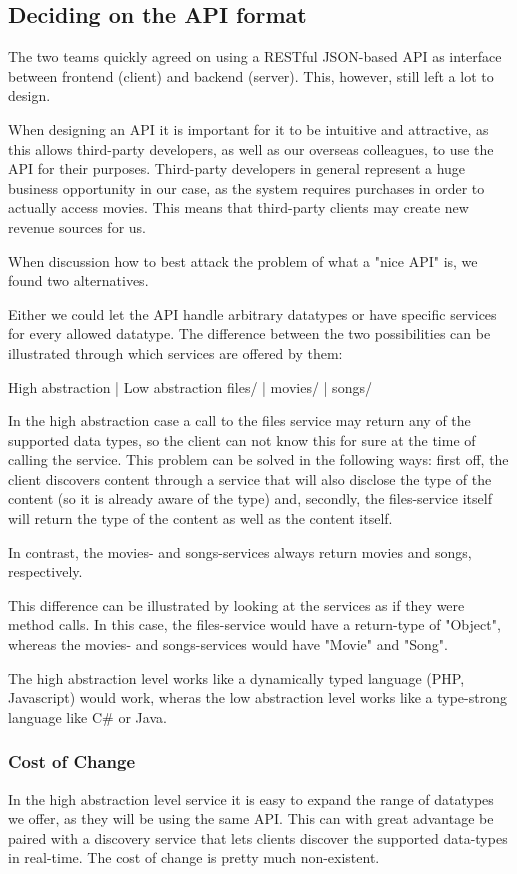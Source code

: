 \subsection{Deciding on the API format}

The two teams quickly agreed on using a RESTful JSON-based API as interface between
frontend (client) and backend (server). This, however, still left a lot to design.

When designing an API it is important for it to be intuitive and attractive, as this
allows third-party developers, as well as our overseas colleagues, to use the API for
their purposes. Third-party developers in general represent a huge business opportunity
in our case, as the system requires purchases in order to actually access movies. This
means that third-party clients may create new revenue sources for us.

When discussion how to best attack the problem of what a "nice API" is, we found two
alternatives.

Either we could let the API handle arbitrary datatypes or have specific services for
every allowed datatype. The difference between the two possibilities can be illustrated
through which services are offered by them:

High abstraction | Low abstraction
files/           | movies/
                 | songs/

In the high abstraction case a call to the files service may return any of the supported
data types, so the client can not know this for sure at the time of calling the service.
This problem can be solved in the following ways: first off, the client discovers content
through a service that will also disclose the type of the content (so it is already aware
of the type) and, secondly, the files-service itself will return the type of the content
as well as the content itself.

In contrast, the movies- and songs-services always return movies and songs, respectively.

This difference can be illustrated by looking at the services as if they were method calls.
In this case, the files-service would have a return-type of "Object", whereas the movies-
and songs-services would have "Movie" and "Song".

The high abstraction level works like a dynamically typed language (PHP, Javascript) would
work, wheras the low abstraction level works like a type-strong language like C\# or Java.

\subsubsection{Cost of Change}
In the high abstraction level service it is easy to expand the range of datatypes we offer,
as they will be using the same API. This can with great advantage be paired with a discovery
service that lets clients discover the supported data-types in real-time. The cost of change
is pretty much non-existent.

